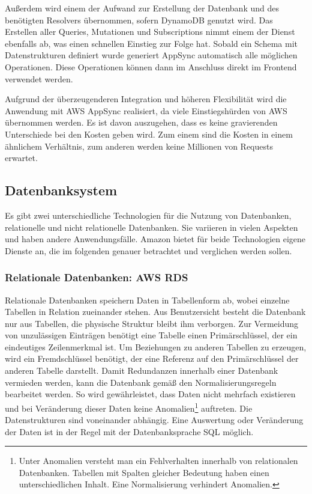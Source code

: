 Außerdem wird einem der Aufwand zur Erstellung der Datenbank und des benötigten Resolvers übernommen, sofern DynamoDB genutzt wird.
Das Erstellen aller Queries, Mutationen und Subscriptions nimmt einem der Dienst ebenfalls ab, was einen schnellen Einstieg zur Folge hat.
Sobald ein Schema mit Datenstrukturen definiert wurde generiert AppSync automatisch alle möglichen Operationen.
Diese Operationen können dann im Anschluss direkt im Frontend verwendet werden.

Aufgrund der überzeugenderen Integration und höheren Flexibilität wird die Anwendung mit AWS AppSync realisiert, da viele Einstiegshürden von AWS übernommen werden.
Es ist davon auszugehen, dass es keine gravierenden Unterschiede bei den Kosten geben wird.
Zum einem sind die Kosten in einem ähnlichem Verhältnis, zum anderen werden keine Millionen von Requests erwartet.





\subsection{Datenbanksystem}
Es gibt zwei unterschiedliche Technologien für die Nutzung von Datenbanken, relationelle und nicht relationelle Datenbanken.
Sie variieren in vielen Aspekten und haben andere Anwendungsfälle.
Amazon bietet für beide Technologien eigene Dienste an, die im folgenden genauer betrachtet und verglichen werden sollen.

\subsubsection{Relationale Datenbanken: AWS RDS}

Relationale Datenbanken speichern Daten in Tabellenform ab, wobei einzelne Tabellen in Relation zueinander stehen.
Aus Benutzersicht besteht die Datenbank nur aus Tabellen, die physische Struktur bleibt ihm verborgen.
Zur Vermeidung von unzulässigen Einträgen benötigt eine Tabelle einen Primärschlüssel, der ein eindeutiges Zeilenmerkmal ist.
Um Beziehungen zu anderen Tabellen zu erzeugen, wird ein Fremdschlüssel benötigt, der eine Referenz auf den Primärschlüssel der anderen Tabelle darstellt.
Damit Redundanzen innerhalb einer Datenbank vermieden werden, kann die Datenbank gemäß den Normalisierungsregeln bearbeitet werden.
So wird gewährleistet, dass Daten nicht mehrfach existieren und bei Veränderung dieser Daten keine Anomalien\footnote{Unter Anomalien versteht man ein Fehlverhalten innerhalb von relationalen Datenbanken. Tabellen
mit Spalten gleicher Bedeutung haben einen unterschiedlichen Inhalt. Eine Normalisierung verhindert Anomalien. } auftreten.
Die Datenstrukturen sind voneinander abhängig. Eine Auswertung oder Veränderung der Daten ist in der Regel mit der Datenbanksprache SQL möglich. \cite[]{Datenbankvergleich}

